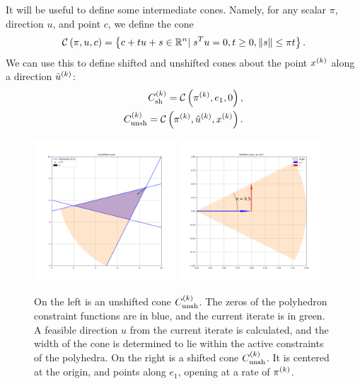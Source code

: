 % 

It will be useful to define some intermediate cones.
Namely, for any scalar $\pi$, direction $u$, and point $c$, we define the cone
\begin{align}
\mathcal C\left(\pi, u, c\right) = \left\{c + t u + s \in \mathbb R^n | \; s^Tu= 0, t \ge 0, \|s\| \le \pi t\right\}.
\end{align}
We can use this to define shifted and unshifted cones about the point $x^{(k)}$ along a direction ${{{\hat u}^{(k)}}}$:
\begin{align}
{C^{(k)}_{\textrm{sh}}} = \mathcal C\left(\pi^{(k)}, e_1, 0\right), \label{defineshiftedcone} \\
{C^{(k)}_{\textrm{unsh}}} = \mathcal C\left(\pi^{(k)}, {{{\hat u}^{(k)}}}, x^{(k)}\right). \label{defineunshiftedcone}
\end{align}


\begin{figure}[ht]
    \centering
    \includegraphics[width=200px]{images/unshifted_cone.png}
    \includegraphics[width=200px]{images/shifted_cone.png}
    \caption[An example of the shifted and unshifted cones]
	{
		On the left is an unshifted cone ${C^{(k)}_{\textrm{unsh}}}$.
		The zeros of the polyhedron constraint functions are in blue, and the current iterate is in green.
		A feasible direction $u$ from the current iterate is calculated, and the width of the cone is determined to lie within the active constraints of the polyhedra.
		On the right is a shifted cone ${C^{(k)}_{\textrm{unsh}}}$.
		It is centered at the origin, and points along $e_1$, opening at a rate of $\pi^{(k)}$.
    }
    \label{linear_cones_images}
\end{figure}

